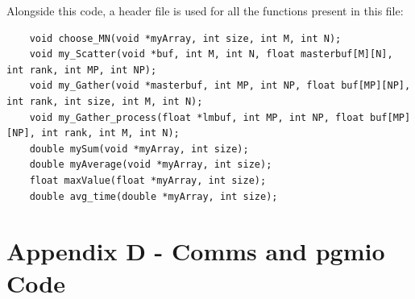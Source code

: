 \documentclass[11pt]{article}
\begin{document}
	Alongside this code, a header file is used for all the functions present in this file:
	\begin{lstlisting}
	void choose_MN(void *myArray, int size, int M, int N);
	void my_Scatter(void *buf, int M, int N, float masterbuf[M][N], int rank, int MP, int NP);
	void my_Gather(void *masterbuf, int MP, int NP, float buf[MP][NP], int rank, int size, int M, int N);
	void my_Gather_process(float *lmbuf, int MP, int NP, float buf[MP][NP], int rank, int M, int N);
	double mySum(void *myArray, int size);
	double myAverage(void *myArray, int size);
	float maxValue(float *myArray, int size);
	double avg_time(double *myArray, int size);
	\end{lstlisting}
	\pagebreak
	
	\section{Appendix D - Comms and pgmio Code}
\end{document}
